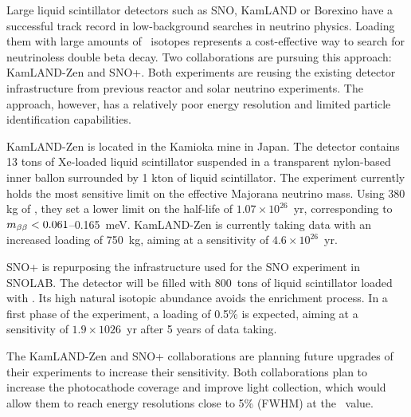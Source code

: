 %
Large liquid scintillator detectors such as SNO, KamLAND or Borexino have a successful track record in low-background searches in neutrino physics. Loading them with large amounts of \bb\ isotopes represents a cost-effective way to search for neutrinoless double beta decay. Two collaborations are pursuing this approach: KamLAND-Zen and SNO+. Both experiments are reusing the existing detector infrastructure from previous reactor and solar neutrino experiments. The approach, however, has a relatively poor energy resolution and limited particle identification capabilities. 

KamLAND-Zen is located in the Kamioka mine in Japan. The detector contains 13 tons of Xe-loaded liquid scintillator suspended in a transparent nylon-based inner ballon surrounded by 1 kton of liquid scintillator. The experiment currently holds the most sensitive limit on the effective Majorana neutrino mass. Using 380 kg of , they set a lower limit on the \bbonu half-life of $1.07\times10^{26}$~yr, corresponding to $m_{\beta\beta}<0.061$--0.165~meV. KamLAND-Zen is currently taking data with an increased loading of 750~kg, aiming at a sensitivity of $4.6\times10^{26}$~yr.

SNO+ is repurposing the infrastructure used for the SNO experiment in SNOLAB. The detector will be filled with 800~tons of liquid scintillator loaded
with . Its high natural isotopic abundance avoids the enrichment process. In a first phase of the experiment, a loading of 0.5\% is expected, aiming at a sensitivity of $1.9\times10{26}$~yr after 5 years of data taking.

The KamLAND-Zen and SNO+ collaborations are planning future upgrades of their experiments to increase
their sensitivity. Both collaborations plan to increase the photocathode coverage and improve light collection, which would allow them to reach energy resolutions close to 5\% (FWHM) at the \Qbb\ value. 